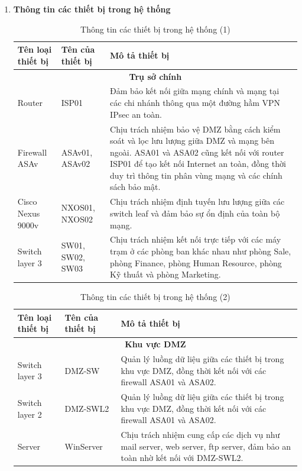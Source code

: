 \documentclass[13pt]{article}
\begin{document}
\begin{enumerate}
\item \textbf{Thông tin các thiết bị trong hệ thống}


\begin{table}[h!]
\centering
\begin{tabular}{|p{2cm}|p{5cm}|p{7cm}|}
\hline
\textbf{Tên loại thiết bị} & \textbf{Tên của thiết bị} & \textbf{Mô tả thiết bị} \\ 
\hline
\multicolumn{3}{|c|}{\textbf{Trụ sở chính}} \\ 
\hline
Router & ISP01 & Đảm bảo kết nối giữa mạng chính và mạng tại các chi nhánh thông qua một đường hầm VPN IPsec an toàn. \\ 
\hline
Firewall ASAv & ASAv01, ASAv02 & Chịu trách nhiệm bảo vệ DMZ bằng cách kiểm soát và lọc lưu lượng giữa DMZ và mạng bên ngoài. ASA01 và ASA02 cũng kết nối với router ISP01 để tạo kết nối Internet an toàn, đồng thời duy trì thông tin phân vùng mạng và các chính sách bảo mật. \\ 
\hline
Cisco Nexus 9000v & NXOS01, NXOS02 & Chịu trách nhiệm định tuyến lưu lượng giữa các switch leaf và đảm bảo sự ổn định của toàn bộ mạng. \\ 
\hline
Switch layer 3 & SW01, SW02, SW03 & Chịu trách nhiệm kết nối trực tiếp với các máy trạm ở các phòng ban khác nhau như phòng Sale, phòng Finance, phòng Human Resource, phòng Kỹ thuất và phòng Marketing. \\ 
\hline
\end{tabular}
\caption{Thông tin các thiết bị trong hệ thống (1)}
\label{tab:comparison}
\end{table}


\begin{table}[h!]
\centering
\begin{tabular}{|p{2cm}|p{5cm}|p{7cm}|}
\hline
\textbf{Tên loại thiết bị} & \textbf{Tên của thiết bị} & \textbf{Mô tả thiết bị} \\ 
\hline
\multicolumn{3}{|c|}{\textbf{Khu vực DMZ}} \\ 
\hline
Switch layer 3 & DMZ-SW & Quản lý luồng dữ liệu giữa các thiết bị trong khu vực DMZ, đồng thời kết nối với các firewall ASA01 và ASA02. \\ 
\hline
Switch layer 2 & DMZ-SWL2 & Quản lý luồng dữ liệu giữa các thiết bị trong khu vực DMZ, đồng thời kết nối với các firewall ASA01 và ASA02.\\
\hline
Server & WinServer & Chịu trách nhiệm cung cấp các dịch vụ như mail server, web server, ftp server, đảm bảo an toàn nhờ kết nối với DMZ-SWL2.\\
\hline
\end{tabular}
\caption{Thông tin các thiết bị trong hệ thống (2)}
\label{tab:comparison}
\end{table}


\end{enumerate}
\end{document}
